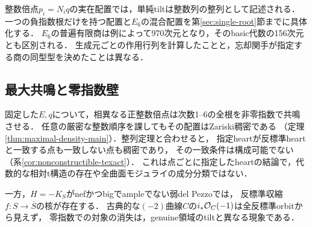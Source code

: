 整数倍点$p_i=N_iq$の実在配置では，単純tiltは整数列の整列として記述される．
一つの負指数根だけを持つ配置と$E_6$の混合配置を第\ref{sec:single-root}節までに具体化する．
$E_6$の普遍有限商は例によって970次元となり，そのbasic代数の156次元とも区別される．
生成元ごとの作用行列を計算したことと，忘却関手が指定する商の同型型を決めたことは異なる．

\subsection{最大共鳴と零指数壁}
固定した$E,q$について，相異なる正整数倍点は次数1--6の全根を非零指数で共鳴させる．
任意の厳密な整数順序を課してもその配置はZariski稠密である
（定理\ref{thm:maximal-density-main}）．整列定理と合わせると，
指定heartが反標準heartと一致する点も一致しない点も稠密であり，
その一致条件は構成可能でない（系\ref{cor:nonconstructible-texact}）．
これは点ごとに指定したheartの結論で，代数的な相対t構造の存在や全曲面モジュライの成分分類ではない．

一方，$H=-K_S$がnefかつbigでampleでない弱del Pezzoでは，
反標準収縮$f:S\to\overline S$の核が存在する．
古典的な$(-2)$曲線$C$の$i_*\mathcal O_C(-1)$は全反標準orbitから見えず，
零指数での対象の消失は，genuine領域のtiltと異なる現象である．

